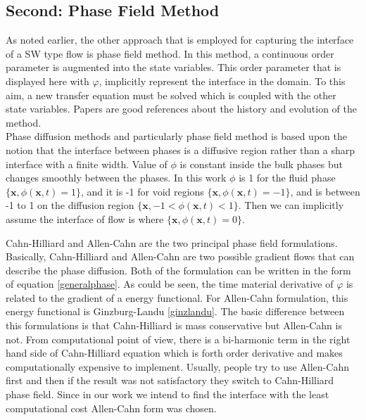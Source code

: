 \documentclass[letterpaper,10pt]{article}
\begin{document}
\subsection{Second: Phase Field Method} \label{phase field}
As noted earlier, the other approach that is employed 
for capturing the interface of a SW type flow is phase field method.
In this method, a continuous
order parameter is augmented into the state variables. This order parameter that is displayed here with $\varphi$, 
implicitly represent the interface in the domain. To this aim, a new transfer equation must be solved which is coupled with the other state variables. Papers \cite{Chen2002,Anderson1998,Boettinger2002,Kim2012} are good references about the history and evolution of the method.\\
Phase diffusion methods and particularly phase field method is based upon the notion that the interface between phases is a diffusive region rather than a sharp interface with a finite width. 
Value of $\phi$ is constant inside the bulk phases but changes smoothly between the phases. In this work $\phi$ is 1 for the fluid phase $ \lbrace \textbf{x}, \phi(\textbf{x},t)=1 \rbrace  $, and it is -1 for void regions $ \lbrace \textbf{x}, \phi(\textbf{x},t)=-1 \rbrace  $, and is between -1 to 1 on the diffusion region $ \lbrace \textbf{x}, -1 < \phi(\textbf{x},t) < 1 \rbrace  $. Then we can implicitly assume the interface of flow is where $ \lbrace \textbf{x}, \phi(\textbf{x},t)= 0 \rbrace  $.\newline

Cahn-Hilliard and Allen-Cahn are the two principal phase field formulations. Basically, Cahn-Hilliard and Allen-Cahn are two possible gradient flows that can describe the phase diffusion. Both of the formulation can be written in the form of equation \eqref{generalphase}. 
 As could be seen, the time material derivative of $\varphi$ is related to the gradient of a energy functional. For Allen-Cahn formulation, this energy functional is Ginzburg-Landu \eqref{ginzlandu}. 
The basic difference between this formulations is that
Cahn-Hilliard is mass conservative but Allen-Cahn is not. From computational point of view, there is a bi-harmonic term in the right hand side of Cahn-Hilliard equation which is forth order derivative and makes computationally expensive to implement. Usually, people try to 
use Allen-Cahn first and then if the result was not satisfactory they switch to Cahn-Hilliard phase field. 
Since in our work we intend to find the interface with the least computational cost Allen-Cahn form was chosen. 
\end{document}
